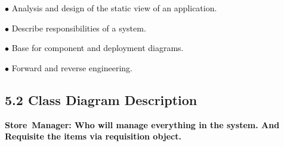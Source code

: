 \documentclass[12pt]{report}
\renewcommand{\_}{\kern-1.5pt\textunderscore\kern-1.5pt}
\begin{document}
\begin{adjustwidth}{0.3in}{0.84in}
\textcolor[HTML]{0D0D0D}{$\bullet$  \tab Analysis and design of the static view of an application. }\par

\end{adjustwidth}

\begin{adjustwidth}{0.3in}{0.84in}
\textcolor[HTML]{0D0D0D}{$\bullet$  \tab Describe responsibilities of a system. }\par

\end{adjustwidth}

\begin{adjustwidth}{0.3in}{0.84in}
\textcolor[HTML]{0D0D0D}{$\bullet$  \tab Base for component and deployment diagrams. }\par

\end{adjustwidth}

\begin{adjustwidth}{0.3in}{0.84in}
\textcolor[HTML]{0D0D0D}{$\bullet$  \tab Forward and reverse engineering.}\par

\end{adjustwidth}


\vspace{\baselineskip}

\vspace{\baselineskip}

\vspace{\baselineskip}

\vspace{\baselineskip}
\begin{adjustwidth}{0.3in}{0.84in}
\subsection*{5.2 Class Diagram Description}
\end{adjustwidth}


\vspace{\baselineskip}
\begin{adjustwidth}{0.3in}{0.84in}
\textbf{\textcolor[HTML]{0D0D0D}{ }}\par

\end{adjustwidth}

\begin{adjustwidth}{0.3in}{0.84in}
\textbf{\textcolor[HTML]{0D0D0D}{Store\ Manager:  Who will manage everything in the system. And Requisite the items via requisition object.}}\par

\end{adjustwidth}
\end{document}
